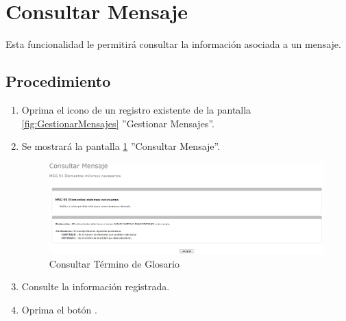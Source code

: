 \hypertarget{cv:consultarMensaje}{\section{Consultar Mensaje}} \label{sec:consultarMensaje}

	Esta funcionalidad le permitirá consultar la información asociada a un mensaje.

		\subsection{Procedimiento}

			\begin{enumerate}
	
			\item Oprima el icono \IUConsultar{} de un registro existente de la pantalla \ref{fig:GestionarMensajes} ''Gestionar Mensajes''.
	
			\item Se mostrará la pantalla \ref{fig:consultarMensaje} ''Consultar Mensaje''.
			
			\begin{figure}[htbp!]
				\begin{center}
					\includegraphics[scale=0.4]{roles/lider/mensajes/pantallas/IU9-4consultarMensaje}
					\caption{Consultar Término de Glosario}
					\label{fig:consultarMensaje}
				\end{center}
			\end{figure}
						
			\item Consulte la información registrada.
			
			\item Oprima el botón \IURegresar.
		\end{enumerate}